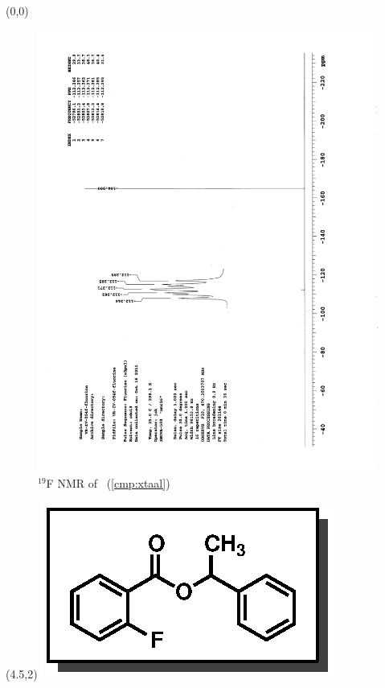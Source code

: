 \clearpage
\begin{textblock}{20}(0,0)
\begin{figure}[htb]
\caption{$^{19}$F NMR of  \CMPxtaal\ (\ref{cmp:xtaal})}
\includegraphics[scale=0.75, trim = 0mm 0mm 0mm 5mm,
clip]{chp_asymmetric/images/nmr/xtaalF}
\vspace{-100pt}
\end{figure}
\end{textblock}
\begin{textblock}{1}(4.5,2)
\includegraphics[scale=0.8, angle=90]{chp_asymmetric/images/xtaal}
\end{textblock}
\clearpage

